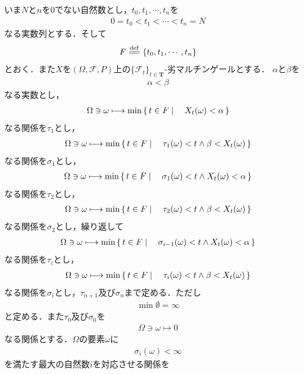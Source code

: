 	いま$N$と$n$を$0$でない自然数とし，$t_0,t_1,\cdots,t_n$を
	\begin{align}
		0 = t_0 < t_1 < \cdots < t_n = N
	\end{align}
	なる実数列とする．そして
	\begin{align}
		F \defeq \{t_0,t_1,\cdots,t_n\}
	\end{align}
	とおく．また$X$を$(\Omega,\mathscr{F},P)$上の$\{\mathscr{F}_t\}_{t \in \mathbf{T}}$-劣マルチンゲールとする．
	$\alpha$と$\beta$を
	\begin{align}
		\alpha < \beta
	\end{align}
	なる実数とし，
	\begin{align}
		\Omega \ni \omega \longmapsto \min{}{\left\{\, t \in F \mid \quad X_t(\omega) < \alpha\, \right\}}
	\end{align}
	なる関係を$\tau_1$とし，
	\begin{align}
		\Omega \ni \omega \longmapsto \min{}{\left\{\, t \in F \mid \quad \tau_1(\omega) < t \wedge \beta < X_t(\omega)\, \right\}}
	\end{align}
	なる関係を$\sigma_1$とし，
	\begin{align}
		\Omega \ni \omega \longmapsto \min{}{\left\{\, t \in F \mid \quad \sigma_1(\omega) < t \wedge X_t(\omega) < \alpha\, \right\}}
	\end{align}
	なる関係を$\tau_2$とし，
	\begin{align}
		\Omega \ni \omega \longmapsto \min{}{\left\{\, t \in F \mid \quad \tau_2(\omega) < t \wedge \beta < X_t(\omega)\, \right\}}
	\end{align}
	なる関係を$\sigma_2$とし，繰り返して
	\begin{align}
		\Omega \ni \omega \longmapsto \min{}{\left\{\, t \in F \mid \quad \sigma_{i-1}(\omega) < t \wedge X_t(\omega) < \alpha\, \right\}}
	\end{align}
	なる関係を$\tau_i$とし，
	\begin{align}
		\Omega \ni \omega \longmapsto \min{}{\left\{\, t \in F \mid \quad \tau_i(\omega) < t \wedge \beta < X_t(\omega)\, \right\}}
	\end{align}
	なる関係を$\sigma_i$とし，$\tau_{n+1}$及び$\sigma_n$まで定める．ただし
	\begin{align}
		\min{}{\emptyset} = \infty
	\end{align}
	と定める．また$\tau_0$及び$\sigma_0$を
	\begin{align}
		\Omega \ni \omega \longmapsto 0
	\end{align}
	なる関係とする．$\Omega$の要素$\omega$に
	\begin{align}
		\sigma_i(\omega) < \infty
	\end{align}
	を満たす最大の自然数$i$を対応させる関係を
